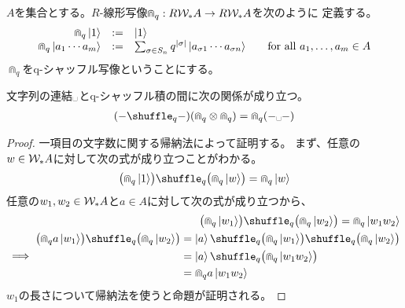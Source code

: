 {	\begin{definition}[q-シャッフル写像]\label{def:q-シャッフル写像} %
		$A$を集合とする。$R$-線形写像$\Cap_q:R{{\mathcal{W}}}_*A\to R{{\mathcal{W}}}_*A$を次のように
		定義する。
		\begin{equation*}\begin{array}{rcll}
			\Cap_q\mathinner{|{1}\rangle} &:=& \mathinner{|{1}\rangle} \\
			\Cap_q\mathinner{|{a_1\cdots a_m}\rangle} 
			&:=& \sum_{\sigma\in S_n} q^{|\sigma|} \mathinner{|{a_{\sigma1}\cdots a_{\sigma n}}\rangle}
			& \quad\text{for all } a_1,\dots,a_m\in A
		\end{array}\end{equation*}
		$\Cap_q$をq-シャッフル写像ということにする。
	\end{definition} %

	\begin{proposition}[q-シャッフル写像その二]
	\label{prop:q-シャッフル写像その二} %
		文字列の連結$\myspace$とq-シャッフル積の間に次の関係が成り立つ。
		\begin{equation*}\begin{split}
			(-\shuffle_q-)(\Cap_q\otimes\Cap_q)
			= \Cap_q(-\myspace-)
		\end{split}\end{equation*}
	\end{proposition} %
	\begin{proof} 一項目の文字数に関する帰納法によって証明する。
	まず、任意の$w\in{\ensuremath{{\mathcal{W}}}}_*A$に対して次の式が成り立つことがわかる。
	\begin{equation*}\begin{split}
		\bigl(\Cap_q\ket{1}\bigr)\shuffle_q\bigl(\Cap_q\ket{w}\bigr)
		= \Cap_q\ket{w}
	\end{split}\end{equation*}
	任意の$w_1,w_2\in{\ensuremath{{\mathcal{W}}}}_*A$と$a\in A$に対して次の式が成り立つから、
	\begin{equation*}\begin{split}
		\bigl(\Cap_q\ket{w_1}\bigr)\shuffle_q\bigl(\Cap_q\ket{w_2}\bigr)
		= \Cap_q\ket{w_1w_2} \\
		\implies \begin{split}
			\bigl(\Cap_qa\ket{w_1}\bigr)\shuffle_q\bigl(\Cap_q\ket{w_2}\bigr)
			& = \ket{a}\shuffle_q\bigl(\Cap_q\ket{w_1}\bigr)
				\shuffle_q\bigl(\Cap_q\ket{w_2}\bigr) \\
			& = \ket{a}\shuffle_q\bigl(\Cap_q\ket{w_1w_2}\bigr) \\
			& = \Cap_qa\ket{w_1w_2}
		\end{split}
	\end{split}\end{equation*}
	$w_1$の長さについて帰納法を使うと命題が証明される。
	\end{proof}

}
